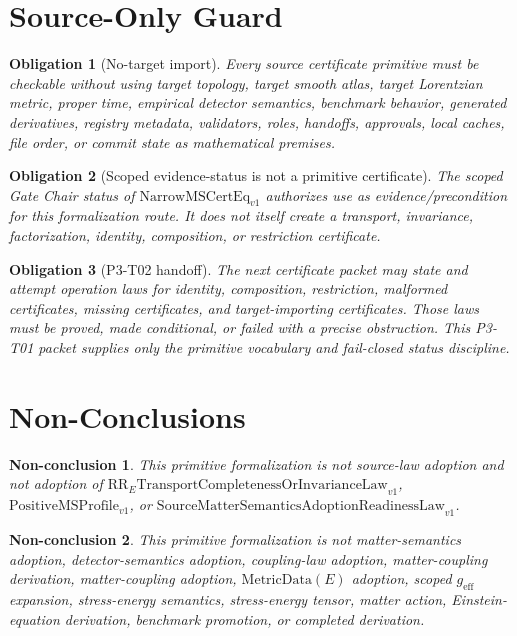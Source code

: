 \documentclass[11pt]{article}
\newcommand{\NarrowMSCertEq}{\mathrm{NarrowMSCertEq}_{v1}}
\newcommand{\RRELaw}{\mathrm{RR}_{E}\mathrm{TransportCompletenessOrInvarianceLaw}_{v1}}
\newcommand{\PositiveMSProfile}{\mathrm{PositiveMSProfile}_{v1}}
\newcommand{\SMSAR}{\mathrm{SourceMatterSemanticsAdoptionReadinessLaw}_{v1}}
\newcommand{\MetricData}{\mathrm{MetricData}}
\newcommand{\geff}{g_{\mathrm{eff}}}
\newtheorem{obligation}{Obligation}
\newtheorem{nonconclusion}{Non-conclusion}
\begin{document}
\section{Source-Only Guard}

\begin{obligation}[No-target import]
Every source certificate primitive must be checkable without using target
topology, target smooth atlas, target Lorentzian metric, proper time,
empirical detector semantics, benchmark behavior, generated derivatives,
registry metadata, validators, roles, handoffs, approvals, local caches, file
order, or commit state as mathematical premises.
\end{obligation}

\begin{obligation}[Scoped evidence-status is not a primitive certificate]
The scoped Gate Chair status of \(\NarrowMSCertEq\) authorizes use as
evidence/precondition for this formalization route. It does not itself create
a transport, invariance, factorization, identity, composition, or restriction
certificate.
\end{obligation}

\begin{obligation}[P3-T02 handoff]
The next certificate packet may state and attempt operation laws for identity,
composition, restriction, malformed certificates, missing certificates, and
target-importing certificates. Those laws must be proved, made conditional, or
failed with a precise obstruction. This P3-T01 packet supplies only the
primitive vocabulary and fail-closed status discipline.
\end{obligation}

\section{Non-Conclusions}

\begin{nonconclusion}
This primitive formalization is not source-law adoption and not adoption of
\(\RRELaw\), \(\PositiveMSProfile\), or \(\SMSAR\).
\end{nonconclusion}

\begin{nonconclusion}
This primitive formalization is not matter-semantics adoption,
detector-semantics adoption, coupling-law adoption, matter-coupling
derivation, matter-coupling adoption, \(\MetricData(E)\) adoption, scoped
\(\geff\) expansion, stress-energy semantics, stress-energy tensor, matter
action, Einstein-equation derivation, benchmark promotion, or completed
derivation.
\end{nonconclusion}
\end{document}
